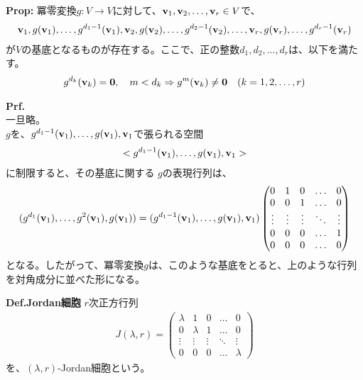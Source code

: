 \documentclass[a4paper,11pt]{jsarticle}
\numberwithin{equation}{section}
\begin{document}
\begin{itembox}[l]{\textbf{Prop:}}
  冪零変換$g: V \to V$に対して、$\vb{v}_1, \vb{v}_2, \dots, \vb{v}_r \in V$で、
  \begin{align}
    \vb{v}_1, g(\vb{v}_1), \dots, g^{d_1-1}(\vb{v}_1), \vb{v}_2, g(\vb{v}_2), \dots, g^{d_2-1}(\vb{v}_2), \dots, \vb{v}_r, g(\vb{v}_r), \dots, g^{d_r-1}(\vb{v}_r)
  \end{align}
  が$V$の基底となるものが存在する。ここで、正の整数$d_1, d_2, \dots, d_r$は、以下を満たす。
  \begin{align}
    g^{d_k}(\vb{v}_k) = \vb{0} ,\quad m < d_k \Rightarrow g^{m}(\vb{v}_k) \neq \vb{0} \quad (k = 1,2,\dots,r)
  \end{align}
\end{itembox}
\textbf{Prf.}\\
一旦略。\hfill\qedsymbol\\

$g$を、$g^{d_1-1}(\vb{v}_1),\dots,g(\vb{v}_1),\vb{v}_1$で張られる空間
\begin{align}
  < g^{d_1-1}(\vb{v}_1),\dots,g(\vb{v}_1),\vb{v}_1 >
\end{align}
に制限すると、その基底に関する
$g$の表現行列は、
\begin{align}
  (g^{d_1}(\vb{v}_1),\dots,g^2(\vb{v}_1),g(\vb{v}_1))
  =
  (g^{d_1-1}(\vb{v}_1),\dots,g(\vb{v}_1),\vb{v}_1)
  \begin{pmatrix}
    0 & 1 & 0 & \dots & 0\\
    0 & 0 & 1 & \dots & 0\\
    \vdots & \vdots & \vdots & \ddots & \vdots\\
    0 & 0 & 0 & \dots & 1\\
    0 & 0 & 0 & \dots & 0
  \end{pmatrix}
\end{align}
となる。したがって、冪零変換$g$は、このような基底をとると、上のような行列を対角成分に並べた形になる。\\

\begin{itembox}[l]{\textbf{Def.Jordan細胞}}
  $r$次正方行列
  \begin{align}
    J(\lambda, r) =
    \begin{pmatrix}
      \lambda & 1 & 0 & \dots & 0\\
      0 & \lambda & 1 & \dots & 0\\
      \vdots & \vdots & \vdots & \ddots & \vdots\\
      0 & 0 & 0 & \dots & \lambda
    \end{pmatrix}
  \end{align}
  を、$(\lambda, r)$-Jordan細胞という。

\end{itembox}
\end{document}
